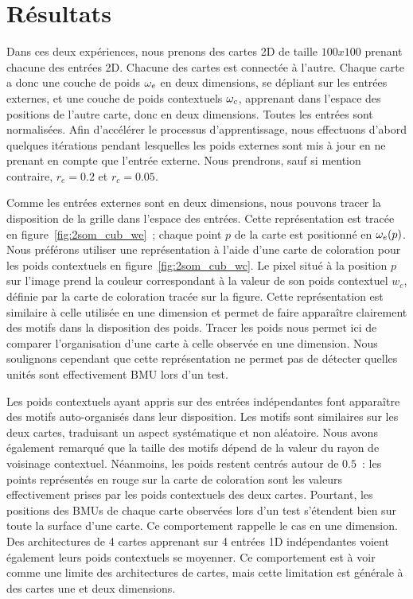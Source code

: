 \documentclass[../main]{subfiles}
\begin{document}
\section{Résultats}

Dans ces deux expériences, nous prenons des cartes 2D de taille $100x100$ prenant chacune des entrées 2D. Chacune des cartes est connectée à l'autre. Chaque carte a donc une couche de poids $\omega_{e}$ en deux dimensions, se dépliant sur les entrées externes, et une couche de poids contextuels $\omega_c$, apprenant dans l'espace des positions de l'autre carte, donc en deux dimensions. Toutes les entrées sont normalisées.
Afin d'accélérer le processus d'apprentissage, nous effectuons d'abord quelques itérations pendant lesquelles les poids externes sont mis à jour en ne prenant en compte que l'entrée externe. Nous prendrons, sauf si mention contraire, $r_e = 0.2$ et $r_c = 0.05$. 

Comme les entrées externes sont en deux dimensions, nous pouvons tracer la disposition de la grille dans l'espace des entrées.
Cette représentation est tracée en figure~\ref{fig:2som_cub_we}~; chaque point $p$ de la carte est positionné en $\omega_e(p)$. Nous préférons utiliser une représentation à l'aide d'une carte de coloration pour les poids contextuels en figure~\ref{fig:2som_cub_wc}. Le pixel situé à la position $p$ sur l'image prend la couleur correspondant à la valeur de son poids contextuel $w_c$, définie par la carte de coloration tracée sur la figure.
Cette représentation est similaire à celle utilisée en une dimension et permet de faire apparaître clairement des motifs dans la disposition des poids.
Tracer les poids nous permet ici de comparer l'organisation d'une carte à celle observée en une dimension. Nous soulignons cependant que cette représentation ne permet pas de détecter quelles unités sont effectivement BMU lors d'un test.

Les poids contextuels ayant appris sur des entrées indépendantes font apparaître des motifs auto-organisés dans leur disposition. Les motifs sont similaires sur les deux cartes, traduisant un aspect systématique et non aléatoire. Nous avons également remarqué que la taille des motifs dépend de la valeur du rayon de voisinage contextuel.
Néanmoins, les poids restent centrés autour de $0.5$~: les points représentés en rouge sur la carte de coloration sont les valeurs effectivement prises par les poids contextuels des deux cartes. Pourtant, les positions des BMUs de chaque carte observées lors d'un test s'étendent bien sur toute la surface d'une carte.
Ce comportement rappelle le cas en une dimension. Des architectures de 4 cartes apprenant sur 4 entrées 1D indépendantes voient également leurs poids contextuels se moyenner. Ce comportement est à voir comme une limite des architectures de cartes, mais cette limitation est générale à des cartes une et deux dimensions. 
\end{document}
